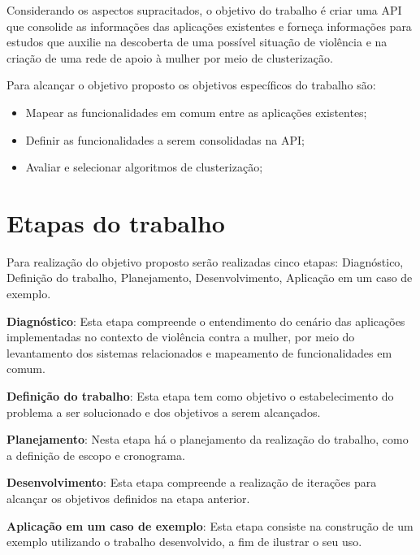 Considerando os aspectos supracitados, o objetivo do trabalho é criar uma API que consolide as informações das aplicações existentes e forneça informações para estudos que auxilie na descoberta de uma possível situação de violência e na criação de uma rede de apoio à mulher por meio de clusterização.

Para alcançar o objetivo proposto os objetivos específicos do trabalho são:
\begin{itemize}
	\item Mapear as funcionalidades em comum entre as aplicações existentes;
	\item Definir as funcionalidades a serem consolidadas na API;
	\item Avaliar e selecionar algoritmos de clusterização;
\end{itemize}

\section{Etapas do trabalho}

Para realização do objetivo proposto serão realizadas cinco etapas: 
Diagnóstico, Definição do trabalho, Planejamento, Desenvolvimento, Aplicação em um caso de exemplo.

\noindent \textbf{Diagnóstico}: Esta etapa compreende o entendimento do cenário das aplicações implementadas no contexto
de violência contra a mulher, por meio do levantamento dos sistemas relacionados e mapeamento
de funcionalidades em comum.

\noindent \textbf{Definição do trabalho}: Esta etapa tem como objetivo o estabelecimento do problema a ser solucionado e dos objetivos a serem alcançados.

\noindent \textbf{Planejamento}: Nesta etapa há o planejamento da realização do trabalho, como a definição de escopo e cronograma.

\noindent \textbf{Desenvolvimento}: Esta etapa compreende a realização de iterações para 
alcançar os objetivos definidos na etapa anterior.

\noindent \textbf{Aplicação em um caso de exemplo}: Esta etapa consiste na construção de um exemplo utilizando o
trabalho desenvolvido, a fim de ilustrar o seu uso.







